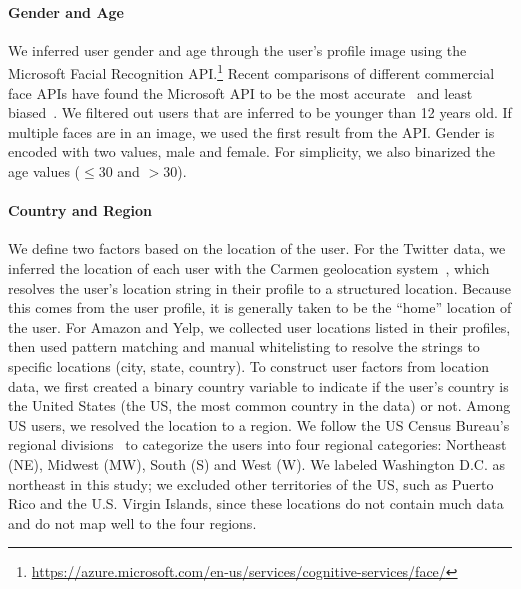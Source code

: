 \paragraph{Gender and Age} 
We inferred user gender and age through the user's profile image using the Microsoft Facial Recognition API.\footnote{\url{https://azure.microsoft.com/en-us/services/cognitive-services/face/}}
Recent comparisons of different commercial face APIs have found the Microsoft API to be the most accurate~\cite{jung2018assessing} and least biased~\cite{buolamwini2018gender}.
We filtered out users that are inferred to be younger than 12 years old. If multiple faces are in an image, we used the first result from the API. 
Gender is encoded with two values, male and female. 
For simplicity, we also binarized the age values ($\leq$$30$ and $>$$30$).

\paragraph{Country and Region}
We define two factors based on the location of the user.
For the Twitter data, we inferred the location of each user with the Carmen geolocation system~\cite{dredze2013carmen},
which resolves the user's location string in their profile to a structured location. Because this comes from the user profile, it is generally taken to be the ``home'' location of the user.
For Amazon and Yelp, we collected user locations listed in their profiles,
then used pattern matching and manual whitelisting to resolve the strings to specific locations (city, state, country). 
To construct user factors from location data,
we first created a binary country variable
to indicate if the user's country is the United States (the US, the most common country in the data) or not. 
Among US users, we resolved the location to a region.
We follow the US Census Bureau's regional divisions~\cite{branch_2012} to categorize the users into four regional categories: Northeast (NE), Midwest (MW), South (S) and West (W). We labeled Washington D.C. as northeast in this study;
we excluded other territories of the US, such as Puerto Rico and the U.S. Virgin Islands, since these locations do not contain much data and do not map well to the four regions.

